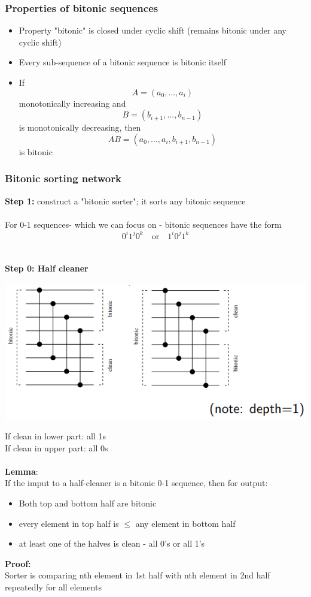 \documentclass{article}[18pt]
\begin{document}
\subsubsection{Properties of bitonic sequences}
\begin{itemize}
	\item Property "bitonic" is closed under cyclic shift (remains bitonic under any cyclic shift)
	\item Every sub-sequence of a bitonic sequence is bitonic itself 
	\item If
$$A=(a_0,...,a_i)$$
monotonically increasing and
$$B=(b_{i+1},...,b_{n-1})$$
is monotonically decreasing, then
$$AB=(a_0,...,a_i,b_{i+1},b_{n-1})$$
is bitonic
\end{itemize}
\subsubsection{Bitonic sorting network}
\textbf{Step 1:} construct a "bitonic sorter"; it sorts any bitonic sequence\\
\\
For 0-1 sequences- which we can focus on - bitonic sequences have the form
$$0^i1^j0^k \quad \text{or} \quad 1^i0^j1^k$$
\\
\paragraph{Step 0: Half cleaner}
\begin{center}
	\includegraphics[scale=0.9]{half_cleaner}
\end{center}
If clean in lower part: all 1s\\
If clean in upper part: all 0s\\
\\
\textbf{Lemma}:\\
If the imput to a half-cleaner is a bitonic 0-1 sequence, then for output:
\begin{itemize}
	\item Both top and bottom half are bitonic
	\item every element in top half is $\leqslant$ any element in bottom half
	\item at least one of the halves is clean - all 0's or all 1's
\end{itemize}
\textbf{Proof:}\\
Sorter is comparing nth element in 1st half with nth element in 2nd half repeatedly for all elements\\
\end{document}

